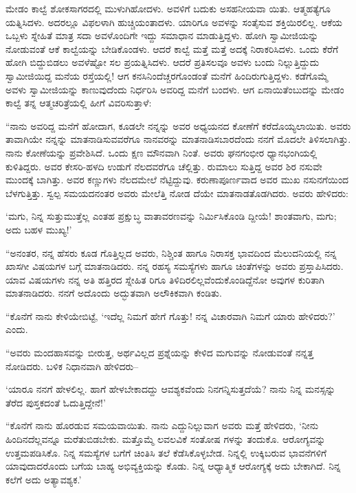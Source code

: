 ಮೇಡಂ ಕಾಲ್ವೆ ಶೋಕಸಾಗರದಲ್ಲಿ ಮುಳುಗಿಹೋದಳು. ಅವಳಿಗೆ ಬದುಕು ಅಸಹನೀಯವಾ ಯಿತು. ಆತ್ಮಹತ್ಯೆಗೂ ಯತ್ನಿಸಿದಳು. ಅದರಲ್ಲೂ ವಿಫಲಳಾಗಿ ಹುಚ್ಚಿಯಂತಾದಳು. ಯಾರಿಗೂ ಅವಳನ್ನು ಸಂತೈಸುವ ಶಕ್ತಿಯಿರಲಿಲ್ಲ. ಆಕೆಯ ಒಬ್ಬಳು ಸ್ನೇಹಿತೆ ಮಾತ್ರ ಸದಾ ಅವಳೊಂದಿಗೇ ಇದ್ದು ಸಮಾಧಾನ ಮಾಡುತ್ತಿದ್ದಳು. ಹೋಗಿ ಸ್ವಾಮೀಜಿಯನ್ನು ನೋಡುವಂತೆ ಆಕೆ ಕಾಲ್ವೆಯನ್ನು ಬೇಡಿಕೊಂಡಳು. ಆದರೆ ಕಾಲ್ವೆ ಮತ್ತೆ ಮತ್ತೆ ಅದಕ್ಕೆ ನಿರಾಕರಿಸಿದಳು. ಒಂದು ಕೆರೆಗೆ ಹೋಗಿ ಬಿದ್ದುಬಿಡಲು ಅವಳೆಷ್ಟೋ ಸಲ ಪ್ರಯತ್ನಿಸಿದಳು. ಆದರೆ ಪ್ರತಿಸಲವೂ ಅವಳು ಬಂದು ನಿಲ್ಲುತ್ತಿದ್ದುದು ಸ್ವಾಮೀಜಿಯಿದ್ದ ಮನೆಯ ರಸ್ತೆಯಲ್ಲಿ! ಆಗ ಕನಸಿನಿಂದೆಚ್ಚರಗೊಂಡಂತೆ ಮನೆಗೆ ಹಿಂದಿರುಗುತ್ತಿದ್ದಳು. ಕಡೆಗೊಮ್ಮೆ ಅವಳು ಸ್ವಾಮೀಜಿಯನ್ನು ಕಾಣುವುದೆಂದು ನಿರ್ಧರಿಸಿ ಅವರಿದ್ದ ಮನೆಗೆ ಬಂದಳು. ಆಗ ಏನಾಯಿತೆಂಬುದನ್ನು ಮೇಡಂ ಕಾಲ್ವೆ ತನ್ನ ಆತ್ಮಚರಿತ್ರೆಯಲ್ಲಿ  ಹೀಗೆ ವಿವರಿಸುತ್ತಾಳೆ:

“ನಾನು ಅವರಿದ್ದ ಮನೆಗೆ ಹೋದಾಗ, ಕೂಡಲೇ ನನ್ನನ್ನು ಅವರ ಅಧ್ಯಯನದ ಕೋಣೆಗೆ ಕರೆದೊಯ್ಯಲಾಯಿತು. ಅವರು ತಾವಾಗಿಯೇ ನನ್ನನ್ನು ಮಾತನಾಡಿಸುವವರೆಗೂ ನಾನವರನ್ನು ಮಾತನಾಡಿಸಬಾರದೆಂದು ನನಗೆ ಮೊದಲೇ ತಿಳಿಸಲಾಗಿತ್ತು. ನಾನು ಕೋಣೆಯನ್ನು ಪ್ರವೇಶಿಸಿದೆ. ಒಂದು ಕ್ಷಣ ಮೌನವಾಗಿ ನಿಂತೆ. ಅವರು ಘನಗಂಭೀರ ಧ್ಯಾನಭಂಗಿಯಲ್ಲಿ ಕುಳಿತಿದ್ದರು. ಅವರ ಕೇಸರಿ-ಹಳದಿ ಉಡುಗೆ ನೆಲದವರೆಗೂ ಚೆಲ್ಲಿತ್ತು. ರುಮಾಲು ಸುತ್ತಿದ್ದ ಅವರ ಶಿರ ನಸುವೇ ಮುಂದಕ್ಕೆ ಬಾಗಿತ್ತು. ಅವರ ಕಣ್ಣುಗಳು ನೆಲದಮೇಲೆ ನೆಟ್ಟಿದ್ದುವು. ಕರುಣಾಪೂರ್ಣವಾದ ಅವರ ಮುಖ ನಸುನಗೆಯಿಂದ ಬೆಳಗುತ್ತಿತ್ತು. ಸ್ವಲ್ಪ ಸಮಯದನಂತರ ಅವರು ಮೇಲೆತ್ತಿ ನೋಡ ದೆಯೇ ಮಾತನಾಡತೊಡಗಿದರು. ಅವರು ಹೇಳಿದರು:

‘ಮಗು, ನಿನ್ನ ಸುತ್ತುಮುತ್ತೆಲ್ಲ ಎಂತಹ ಪ್ರಕ್ಷುಬ್ಧ ವಾತಾವರಣವನ್ನು ನಿರ್ಮಿಸಿಕೊಂಡಿ ದ್ದೀಯೆ! ಶಾಂತವಾಗು, ಮಗು; ಅದು ಬಹಳ ಮುಖ್ಯ!’

“ಅನಂತರ, ನನ್ನ ಹೆಸರು ಕೂಡ ಗೊತ್ತಿಲ್ಲದ ಅವರು, ನಿಶ್ಚಿಂತ ಹಾಗೂ ನಿರಾಸಕ್ತ ಭಾವದಿಂದ ಮೆಲುದನಿಯಲ್ಲಿ ನನ್ನ ಖಾಸಗೀ ವಿಷಯಗಳ ಬಗ್ಗೆ ಮಾತನಾಡಿದರು. ನನ್ನ ರಹಸ್ಯ ಸಮಸ್ಯೆಗಳು ಹಾಗೂ ಚಿಂತೆಗಳನ್ನು ಅವರು ಪ್ರಸ್ತಾಪಿಸಿದರು. ಯಾವ ವಿಷಯಗಳು ನನ್ನ ಅತಿ ಹತ್ತಿರದ ಸ್ನೇಹಿತ ರಿಗೂ ತಿಳಿದಿರಲಿಲ್ಲವೆಂದುಕೊಂಡಿದ್ದೆನೋ ಅವುಗಳ ಕುರಿತಾಗಿ ಮಾತನಾಡಿದರು. ನನಗೆ ಅದೊಂದು ಅದ್ಭುತವಾಗಿ ಅಲೌಕಿಕವಾಗಿ ಕಂಡಿತು.

“ಕೊನೆಗೆ ನಾನು ಕೇಳಿಯೇಬಿಟ್ಟೆ, ‘ಇದೆಲ್ಲ ನಿಮಗೆ ಹೇಗೆ ಗೊತ್ತು! ನನ್ನ ವಿಚಾರವಾಗಿ ನಿಮಗೆ ಯಾರು ಹೇಳಿದರು?’ ಎಂದು.

“ಅವರು ಮಂದಹಾಸವನ್ನು ಬೀರುತ್ತ, ಅರ್ಥವಿಲ್ಲದ ಪ್ರಶ್ನೆಯನ್ನು ಕೇಳಿದ ಮಗುವನ್ನು ನೋಡುವಂತೆ ನನ್ನತ್ತ ನೋಡಿದರು. ಬಳಿಕ ನಿಧಾನವಾಗಿ ಹೇಳಿದರು–

‘ಯಾರೂ ನನಗೆ ಹೇಳಲಿಲ್ಲ. ಹಾಗೆ ಹೇಳಬೇಕಾದದ್ದು ಆವಶ್ಯಕವೆಂದು ನಿನಗನ್ನಿಸುತ್ತದೆಯೆ? ನಾನು ನಿನ್ನ ಮನಸ್ಸನ್ನು ತೆರೆದ ಪುಸ್ತಕದಂತೆ ಓದುತ್ತಿದ್ದೇನೆ!’

“ಕೊನೆಗೆ ನಾನು ಹೊರಡುವ ಸಮಯವಾಯಿತು. ನಾನು ಎದ್ದುನಿಲ್ಲುವಾಗ ಅವರು ಮತ್ತೆ ಹೇಳಿದರು, ‘ನೀನು ಹಿಂದಿನದೆಲ್ಲವನ್ನೂ ಮರೆತುಬಿಡಬೇಕು. ಮತ್ತೊಮ್ಮೆ ಲವಲವಿಕೆ ಸಂತೋಷ ಗಳನ್ನು ತಂದುಕೊ. ಆರೋಗ್ಯವನ್ನು ಉತ್ತಮಪಡಿಸಿಕೊ. ನಿನ್ನ ಸಮಸ್ಯೆಗಳ ಬಗೆಗೆ ಚಿಂತಿಸಿ ತಲೆ ಕೆಡೆಸಿಕೊಳ್ಳಬೇಡ. ನಿನ್ನಲ್ಲಿ ಉಕ್ಕಿಬರುವ ಭಾವನೆಗಳಿಗೆ ಯಾವುದಾದರೊಂದು ಬಗೆಯ ಬಾಹ್ಯ ಅಭಿವ್ಯಕ್ತಿಯನ್ನು ಕೊಡು. ನಿನ್ನ ಆಧ್ಯಾತ್ಮಿಕ ಆರೋಗ್ಯಕ್ಕೆ ಅದು ಬೇಕಾಗಿದೆ. ನಿನ್ನ ಕಲೆಗೆ ಅದು ಅತ್ಯಾವಶ್ಯಕ.’

